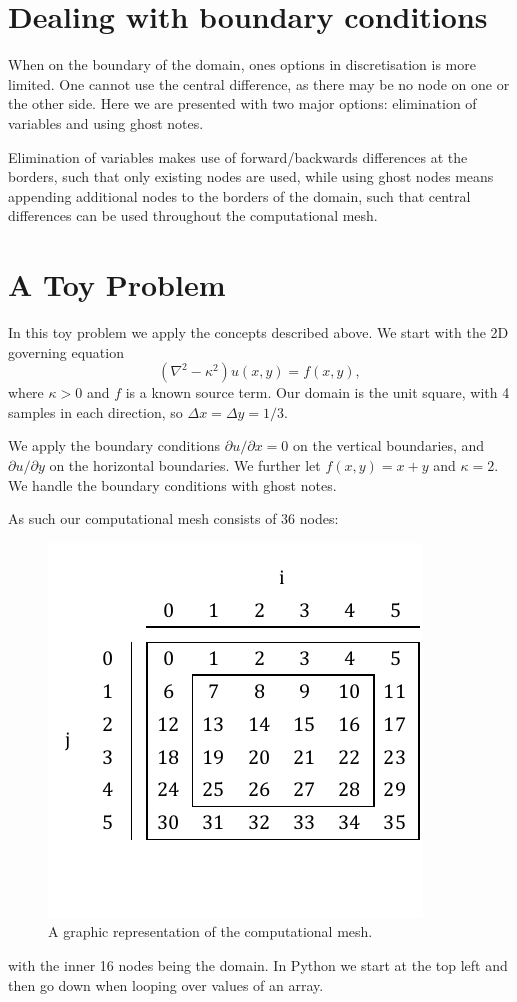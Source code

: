 \documentclass[sigconf]{acmart}
\begin{document}
\section{Dealing with boundary conditions}
When on the boundary of the domain, ones options in discretisation is more limited. One cannot use the central difference, as there may be no node on one or the other side. Here we are presented with two major options: elimination of variables and using ghost notes. 

Elimination of variables makes use of forward/backwards differences at the borders, such that only existing nodes are used, while using ghost nodes means appending additional nodes to the borders of the domain, such that central differences can be used throughout the computational mesh.

\section{A Toy Problem}
In this toy problem we apply the concepts described above. We start with the 2D governing equation
\begin{equation}\label{key}
	(\nabla^2 - \kappa^2)u(x,y) = f(x,y),
\end{equation}
where $ \kappa > 0 $ and $ f $ is a known source term. Our domain is the unit square, with 4 samples in each direction, so $\Delta x = \Delta y = 1/3  $.

We apply the boundary conditions $ \partial u / \partial x = 0 $ on the vertical boundaries, and $ \partial u / \partial y $ on the horizontal boundaries. We further let $ f(x,y) = x+y $ and $ \kappa = 2 $. We handle the boundary conditions with ghost notes.

As such our computational mesh consists of 36 nodes:
\begin{figure}[H]
	\centering
	\includegraphics{indices.pdf}
	\caption{A graphic representation of the computational mesh.}
	\label{fig:matrix_assembly}
\end{figure}
with the inner 16 nodes being the domain. In Python we start at the top left and then go down when looping over values of an array.
\end{document}
